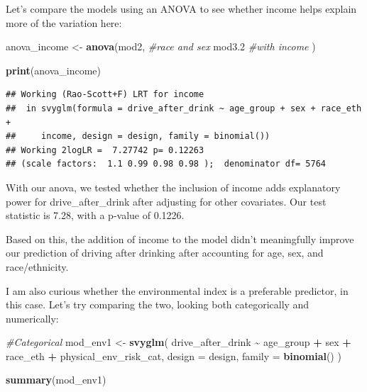 \documentclass[
]{article}
\newenvironment{Shaded}{\begin{snugshade}}{\end{snugshade}}
\newcommand{\AttributeTok}[1]{\textcolor[rgb]{0.13,0.29,0.53}{#1}}
\newcommand{\CommentTok}[1]{\textcolor[rgb]{0.56,0.35,0.01}{\textit{#1}}}
\newcommand{\FloatTok}[1]{\textcolor[rgb]{0.00,0.00,0.81}{#1}}
\newcommand{\FunctionTok}[1]{\textcolor[rgb]{0.13,0.29,0.53}{\textbf{#1}}}
\newcommand{\NormalTok}[1]{#1}
\newcommand{\OtherTok}[1]{\textcolor[rgb]{0.56,0.35,0.01}{#1}}
\newcommand{\SpecialCharTok}[1]{\textcolor[rgb]{0.81,0.36,0.00}{\textbf{#1}}}
\begin{document}
Let's compare the models using an ANOVA to see whether income helps
explain more of the variation here:

\begin{Shaded}
\begin{Highlighting}[]
\NormalTok{anova\_income }\OtherTok{\textless{}{-}} \FunctionTok{anova}\NormalTok{(mod2, }\CommentTok{\#race and sex }
\NormalTok{                      mod3}\FloatTok{.2} \CommentTok{\#with income}
\NormalTok{                      ) }

\FunctionTok{print}\NormalTok{(anova\_income)}
\end{Highlighting}
\end{Shaded}

\begin{verbatim}
## Working (Rao-Scott+F) LRT for income
##  in svyglm(formula = drive_after_drink ~ age_group + sex + race_eth + 
##     income, design = design, family = binomial())
## Working 2logLR =  7.27742 p= 0.12263 
## (scale factors:  1.1 0.99 0.98 0.98 );  denominator df= 5764
\end{verbatim}

With our anova, we tested whether the inclusion of income adds
explanatory power for drive\_after\_drink after adjusting for other
covariates. Our test statistic is 7.28, with a p-value of 0.1226.

Based on this, the addition of income to the model didn't meaningfully
improve our prediction of driving after drinking after accounting for
age, sex, and race/ethnicity.

I am also curious whether the environmental index is a preferable
predictor, in this case. Let's try comparing the two, looking both
categorically and numerically:

\begin{Shaded}
\begin{Highlighting}[]
\CommentTok{\#Categorical}
\NormalTok{mod\_env1 }\OtherTok{\textless{}{-}} \FunctionTok{svyglm}\NormalTok{(}
\NormalTok{  drive\_after\_drink }\SpecialCharTok{\textasciitilde{}}\NormalTok{ age\_group }\SpecialCharTok{+}\NormalTok{ sex }\SpecialCharTok{+}\NormalTok{ race\_eth }\SpecialCharTok{+}
\NormalTok{  physical\_env\_risk\_cat,}
  \AttributeTok{design =}\NormalTok{ design,}
  \AttributeTok{family =} \FunctionTok{binomial}\NormalTok{()}
\NormalTok{)  }

\FunctionTok{summary}\NormalTok{(mod\_env1)}
\end{Highlighting}
\end{Shaded}
\end{document}
